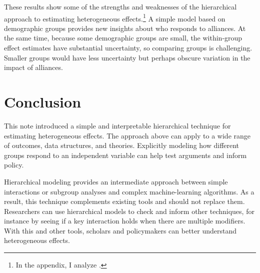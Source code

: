 \documentclass[12pt]{article}
\begin{document}
These results show some of the strengths and weaknesses of the hierarchical approach to estimating heterogeneous effects.\footnote{In the appendix, I analyze \citet{BushPrather2020}.}
A simple model based on demographic groups provides new insights about who responds to alliances. 
At the same time, because some demographic groups are small, the within-group effect estimates have substantial uncertainty, so comparing groups is challenging. 
Smaller groups would have less uncertainty but perhaps obscure variation in the impact of alliances. 


\section{Conclusion}

This note introduced a simple and interpretable hierarchical technique for estimating heterogeneous effects. 
The approach above can apply to a wide range of outcomes, data structures, and theories. 
Explicitly modeling how different groups respond to an independent variable can help test arguments and inform policy.  


Hierarchical modeling provides an intermediate approach between simple interactions or subgroup analyses and complex machine-learning algorithms. 
As a result, this technique complements existing tools and should not replace them. 
Researchers can use hierarchical models to check and inform other techniques, for instance by seeing if a key interaction holds when there are multiple modifiers. 
With this and other tools, scholars and policymakers can better understand heterogeneous effects.


\singlespace
 
 


%
\end{document}
